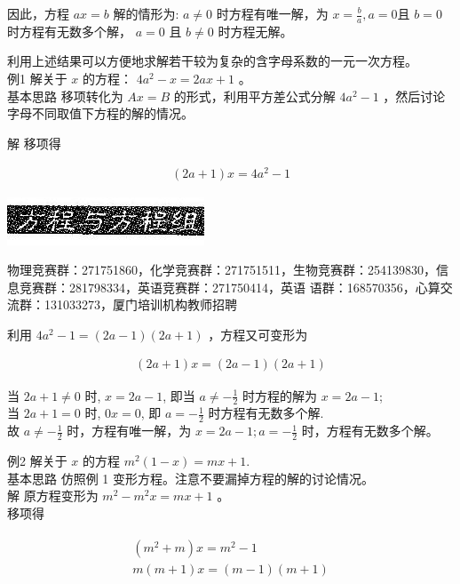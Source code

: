 \documentclass[10pt]{article}
\begin{document}
因此，方程 $a x=b$ 解的情形为: $a \neq 0$ 时方程有唯一解，为 $x=\frac{b}{a}, a=0$且 $b=0$ 时方程有无数多个解， $a=0$ 且 $b \neq 0$ 时方程无解。

利用上述结果可以方便地求解若干较为复杂的含字母系数的一元一次方程。\\
例1 解关于 $x$ 的方程： $4 a^{2}-x=2 a x+1$ 。\\
基本思路 移项转化为 $A x=B$ 的形式，利用平方差公式分解 $4 a^{2}-1$ ，然后讨论字母不同取值下方程的解的情况。

解 移项得

\begin{align*}
(2 a+1) x=4 a^{2}-1
\end{align*}

\begin{center}
\includegraphics[max width=\textwidth]{2024_10_30_26b590fd1106d28139f0g-014}
\end{center}

物理竞赛群：271751860，化学竞赛群：271751511，生物竞赛群：254139830，信息竞赛群：281798334，英语竞赛群：271750414，英语 语群：168570356，心算交流群：131033273，厦门培训机构教师招聘

利用 $4 a^{2}-1=(2 a-1)(2 a+1)$ ，方程又可变形为

\begin{align*}
(2 a+1) x=(2 a-1)(2 a+1)
\end{align*}

当 $2 a+1 \neq 0$ 时, $x=2 a-1$, 即当 $a \neq-\frac{1}{2}$ 时方程的解为 $x=2 a-1$;\\
当 $2 a+1=0$ 时, $0 x=0$, 即 $a=-\frac{1}{2}$ 时方程有无数多个解.\\
故 $a \neq-\frac{1}{2}$ 时，方程有唯一解，为 $x=2 a-1 ; a=-\frac{1}{2}$ 时，方程有无数多个解。

例2 解关于 $x$ 的方程 $m^{2}(1-x)=m x+1$.\\
基本思路 仿照例 1 变形方程。注意不要漏掉方程的解的讨论情况。\\
解 原方程变形为 $m^{2}-m^{2} x=m x+1$ 。\\
移项得

\begin{align*}
\begin{gathered}
\left(m^{2}+m\right) x=m^{2}-1 \\
m(m+1) x=(m-1)(m+1)
\end{gathered}
\end{align*}
\end{document}
